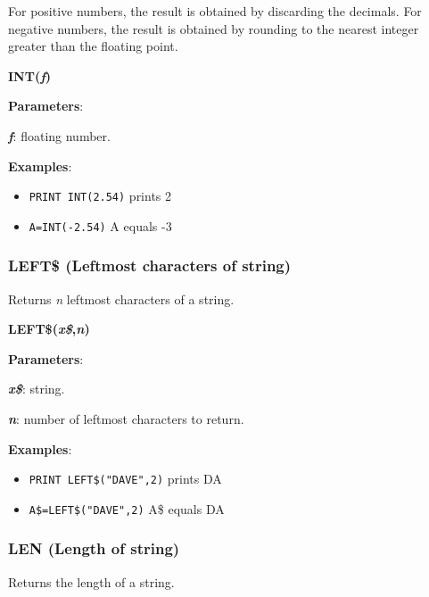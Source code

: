     For positive numbers, the result is obtained by discarding the decimals. For
    negative numbers, the result is obtained by rounding to the nearest integer
    greater than the floating point.

    \hspace{1.9cm}\textbf{INT(\textit{f})}

    \textbf{Parameters}:

    \hspace{1cm}\textbf{\textit{f}}: floating number.

    \textbf{Examples}:
    \begin{itemize}
        \item \texttt{PRINT INT(2.54)} prints 2
        \item \texttt{A=INT(-2.54)} A equals -3
    \end{itemize}

    \subsubsection{{LEFT\$ (Leftmost characters of string)}}
    \label{msbasic:lang:left}
    Returns \textit{n} leftmost characters of a string.

    \hspace{1.9cm}\textbf{LEFT\$(\textit{x\$},\textit{n})}

    \textbf{Parameters}:

    \hspace{1cm}\textbf{\textit{x\$}}: string.

    \hspace{1cm}\textbf{\textit{n}}: number of leftmost characters to return.

    \textbf{Examples}:
    \begin{itemize}
        \item \texttt{PRINT LEFT\$("DAVE",2)} prints DA
        \item \texttt{A\$=LEFT\$("DAVE",2)} A\$ equals DA
    \end{itemize}

    \subsubsection{{LEN (Length of string)}}
    \label{msbasic:lang:len}
    Returns the length of a string.

